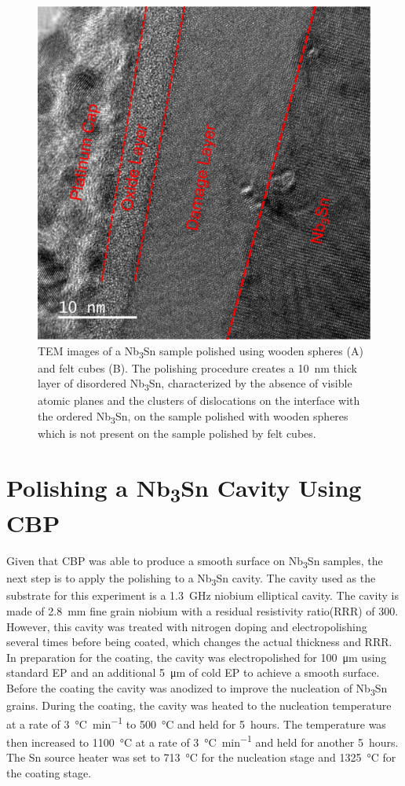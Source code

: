 %


\begin{figure}[t]%
\centering%
\includegraphics[width=0.8\columnwidth]{../doc/figs/Sample_Surface_Damage_Layer.png}%
\caption{TEM images of a Nb\textsubscript{3}Sn sample polished using wooden spheres (A) and felt cubes (B). The polishing procedure creates a 10~nm thick layer of disordered Nb\textsubscript{3}Sn, characterized by the absence of visible atomic planes and the clusters of dislocations on the interface with the ordered Nb\textsubscript{3}Sn, on the sample polished with wooden spheres which is not present on the sample polished by felt cubes.}%
\label{fig:samplesurfacedamagelayer}%
\end{figure}

%
\section{Polishing a Nb\textsubscript{3}Sn Cavity Using CBP}%
\label{sec:cavitycbp}%
Given that CBP was able to produce a smooth surface on Nb\textsubscript{3}Sn samples, the next step is to apply the polishing to a Nb\textsubscript{3}Sn cavity. The cavity used as the substrate for this experiment is a 1.3~GHz niobium elliptical cavity. The cavity is made of 2.8~mm fine grain niobium with a residual resistivity ratio(RRR) of 300. However, this cavity was treated with nitrogen doping and electropolishing several times before being coated, which changes the actual thickness and RRR. In preparation for the coating, the cavity was electropolished for 100~\unit{\micro\metre} using standard EP and an additional 5~\unit{\micro\metre} of cold EP to achieve a smooth surface. Before the coating the cavity was anodized to improve the nucleation of Nb\textsubscript{3}Sn grains. During the coating, the cavity was heated to the nucleation temperature at a rate of 3~\unit{\celsius\per\minute} to 500~°C and held for 5~hours. The temperature was then increased to 1100~°C at a rate of 3~\unit{\celsius\per\minute} and held for another 5~hours. The Sn source heater was set to 713~°C for the nucleation stage and 1325~°C for the coating stage.

